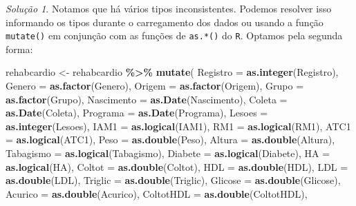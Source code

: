 \documentclass[
]{latex/krantz}
\newenvironment{Shaded}{\begin{snugshade}}{\end{snugshade}}
\newcommand{\AttributeTok}[1]{\textcolor[rgb]{0.13,0.29,0.53}{#1}}
\newcommand{\FunctionTok}[1]{\textcolor[rgb]{0.13,0.29,0.53}{\textbf{#1}}}
\newcommand{\NormalTok}[1]{#1}
\newcommand{\OtherTok}[1]{\textcolor[rgb]{0.56,0.35,0.01}{#1}}
\newcommand{\SpecialCharTok}[1]{\textcolor[rgb]{0.81,0.36,0.00}{\textbf{#1}}}
\theoremstyle{definition}
\theoremstyle{definition}
\theoremstyle{definition}
\theoremstyle{definition}
\theoremstyle{remark}
\newtheorem*{solution}{Solução}
\begin{document}
\begin{solution}
Notamos que há vários tipos inconsistentes. Podemos resolver isso informando os tipos durante o carregamento dos dados ou usando a função \texttt{mutate()} em conjunção com as funções de \texttt{as.*()} do \texttt{R}. Optamos pela segunda forma:

\begin{Shaded}
\begin{Highlighting}[]
\NormalTok{rehabcardio }\OtherTok{\textless{}{-}}\NormalTok{ rehabcardio }\SpecialCharTok{\%\textgreater{}\%}
                  \FunctionTok{mutate}\NormalTok{(}
                    \AttributeTok{Registro =} \FunctionTok{as.integer}\NormalTok{(Registro),}
                    \AttributeTok{Genero =} \FunctionTok{as.factor}\NormalTok{(Genero),}
                    \AttributeTok{Origem =} \FunctionTok{as.factor}\NormalTok{(Origem),}
                    \AttributeTok{Grupo =} \FunctionTok{as.factor}\NormalTok{(Grupo),}
                    \AttributeTok{Nascimento =} \FunctionTok{as.Date}\NormalTok{(Nascimento),}
                    \AttributeTok{Coleta =} \FunctionTok{as.Date}\NormalTok{(Coleta),}
                    \AttributeTok{Programa =} \FunctionTok{as.Date}\NormalTok{(Programa),}
                    \AttributeTok{Lesoes =} \FunctionTok{as.integer}\NormalTok{(Lesoes),}
                    \AttributeTok{IAM1 =} \FunctionTok{as.logical}\NormalTok{(IAM1),}
                    \AttributeTok{RM1 =} \FunctionTok{as.logical}\NormalTok{(RM1),}
                    \AttributeTok{ATC1 =} \FunctionTok{as.logical}\NormalTok{(ATC1),}
                    \AttributeTok{Peso =} \FunctionTok{as.double}\NormalTok{(Peso),}
                    \AttributeTok{Altura =} \FunctionTok{as.double}\NormalTok{(Altura),}
                    \AttributeTok{Tabagismo =} \FunctionTok{as.logical}\NormalTok{(Tabagismo),}
                    \AttributeTok{Diabete =} \FunctionTok{as.logical}\NormalTok{(Diabete),}
                    \AttributeTok{HA =} \FunctionTok{as.logical}\NormalTok{(HA),}
                    \AttributeTok{Coltot =} \FunctionTok{as.double}\NormalTok{(Coltot),}
                    \AttributeTok{HDL =} \FunctionTok{as.double}\NormalTok{(HDL),}
                    \AttributeTok{LDL =} \FunctionTok{as.double}\NormalTok{(LDL),}
                    \AttributeTok{Triglic =} \FunctionTok{as.double}\NormalTok{(Triglic),}
                    \AttributeTok{Glicose =} \FunctionTok{as.double}\NormalTok{(Glicose),}
                    \AttributeTok{Acurico =} \FunctionTok{as.double}\NormalTok{(Acurico),}
                    \AttributeTok{ColtotHDL =} \FunctionTok{as.double}\NormalTok{(ColtotHDL),}

\end{Highlighting}
\end{Shaded}
\end{solution}
\end{document}
